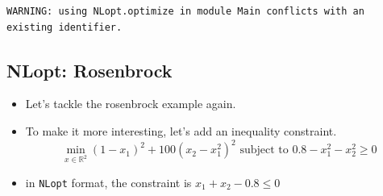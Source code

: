 \documentclass[11pt]{article}
\providecommand{\tightlist}{%
      \setlength{\itemsep}{0pt}\setlength{\parskip}{0pt}}
\begin{document}
    \begin{Verbatim}[commandchars=\\\{\}]
WARNING: using NLopt.optimize in module Main conflicts with an existing identifier.

    \end{Verbatim}

    \subsection{NLopt: Rosenbrock}\label{nlopt-rosenbrock}

\begin{itemize}
\tightlist
\item
  Let's tackle the rosenbrock example again.
\item
  To make it more interesting, let's add an inequality constraint.
  \[ \min_{x\in \mathbb{R}^2} (1-x_1)^2  + 100(x_2-x_1^2)^2  \text{  subject to  } 0.8 - x_1^2 -x_2^2 \geq 0 \]
\item
  in \texttt{NLopt} format, the constraint is \(x_1 + x_2 - 0.8 \leq 0\)
\end{itemize}
\end{document}
